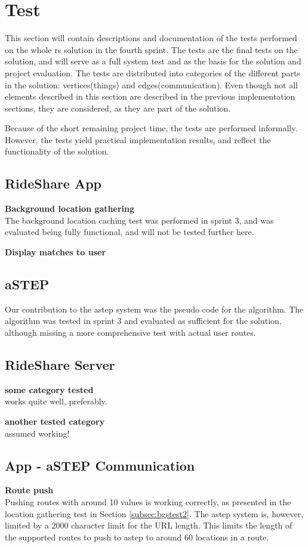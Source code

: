 \section{Test}
This section will contain descriptions and documentation of the tests performed on the whole \gls{rs} solution in the fourth sprint.
The tests are the final tests on the solution, and will serve as a full system test and as the basis for the solution and project evaluation.
The tests are distributed into categories of the different parts in the solution: vertices(things) and edges(communication).
Even though not all elements described in this section are described in the previous implementation sections, they are considered, as they are part of the solution.

Because of the short remaining project time, the tests are performed informally. 
However, the tests yield practical implementation results, and reflect the functionality of the solution.


\subsection{RideShare App}
\textbf{Background location gathering}\\
The background location caching test was performed in sprint 3, and was evaluated being fully functional, and will not be tested further here.

\textbf{Display matches to user}\\


\subsection{aSTEP}
Our contribution to the \gls{astep} system was the pseudo code for the algorithm.
The algorithm was tested in sprint 3 and evaluated as sufficient for the solution, although missing a more comprehensive test with actual user routes.


\subsection{RideShare Server}
\textbf{some category tested}\\
works quite well, preferably.

\textbf{another tested category}\\
assumed working!


\subsection{App - aSTEP Communication}
\textbf{Route push}\\
Pushing routes with around 10 values is working correctly, as presented in the location gathering test in Section \ref{subsec:bgstest2}.
The \gls{astep} system is, however, limited by a 2000 character limit for the URL length.
This limits the length of the supported routes to push to \gls{astep} to around 60 locations in a route.


